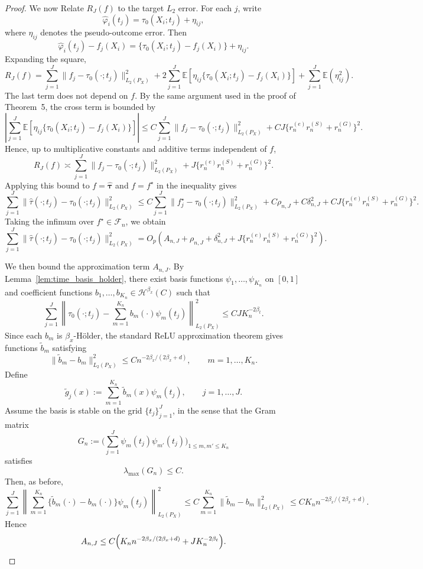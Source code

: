 \documentclass{article}
\newenvironment{proofof}[1]
{\renewcommand{\proofname}{Proof of #1}\begin{proof}}
{\end{proof}}
\begin{document}
\begin{proofof}{Theorem \ref{thm:joint_pseudo}:}
We now Relate \(R_J(f)\) to the target \(L_2\) error.
For each \(j\), write
\[
\hat\varphi_i(t_j)=\tau_0(X_i;t_j)+\eta_{ij},
\]
where \(\eta_{ij}\) denotes the pseudo-outcome error. Then
\[
\hat\varphi_i(t_j)-f_j(X_i)
=
\{\tau_0(X_i;t_j)-f_j(X_i)\}+\eta_{ij}.
\]
Expanding the square,
\[
R_J(f)
=
\sum_{j=1}^J \|f_j-\tau_0(\cdot;t_j)\|_{L_2(P_X)}^2
+
2\sum_{j=1}^J
\mathbb E\!\left[\eta_{ij}\{\tau_0(X_i;t_j)-f_j(X_i)\}\right]
+
\sum_{j=1}^J \mathbb E(\eta_{ij}^2).
\]
The last term does not depend on \(f\). By the same argument used in the proof of Theorem~5, the cross term is bounded by
\[
\left|
\sum_{j=1}^J
\mathbb E\!\left[\eta_{ij}\{\tau_0(X_i;t_j)-f_j(X_i)\}\right]
\right|
\le
C\sum_{j=1}^J \|f_j-\tau_0(\cdot;t_j)\|_{L_2(P_X)}^2
+
C J\{r_n^{(e)}r_n^{(S)}+r_n^{(G)}\}^2.
\]
Hence, up to multiplicative constants and additive terms independent of \(f\),
\[
R_J(f)
\asymp
\sum_{j=1}^J \|f_j-\tau_0(\cdot;t_j)\|_{L_2(P_X)}^2
+
J\{r_n^{(e)}r_n^{(S)}+r_n^{(G)}\}^2.
\]
Applying this bound to \(f=\hat{\boldsymbol\tau}\) and \(f=f^\star\) in the inequality  gives
\[
\sum_{j=1}^J
\|\hat\tau(\cdot;t_j)-\tau_0(\cdot;t_j)\|_{L_2(P_X)}^2
\le
C\sum_{j=1}^J
\|f^\star_j-\tau_0(\cdot;t_j)\|_{L_2(P_X)}^2
+
C\rho_{n,J}
+
C\delta_{n,J}^2
+
C J\{r_n^{(e)}r_n^{(S)}+r_n^{(G)}\}^2.
\]
Taking the infimum over \(f^\star\in\mathcal F_n\), we obtain
\[
\sum_{j=1}^J
\|\hat\tau(\cdot;t_j)-\tau_0(\cdot;t_j)\|_{L_2(P_X)}^2
=
O_p\!\left(
A_{n,J}
+
\rho_{n,J}
+
\delta_{n,J}^2
+
J\{r_n^{(e)}r_n^{(S)}+r_n^{(G)}\}^2
\right).
\]

We then bound the approximation term \(A_{n,J}\). By Lemma~\ref{lem:time_basis_holder}, there exist basis functions
\(\psi_1,\ldots,\psi_{K_n}\) on \([0,1]\) and coefficient functions
\(b_1,\ldots,b_{K_n}\in\mathcal H^{\beta_x}(C)\) such that
\[
\sum_{j=1}^J
\left\|
\tau_0(\cdot;t_j)-\sum_{m=1}^{K_n} b_m(\cdot)\psi_m(t_j)
\right\|_{L_2(P_X)}^2
\le
C J K_n^{-2\beta_t}.
\]
Since each \(b_m\) is \(\beta_x\)-H\"older, the standard ReLU approximation theorem gives functions \(\tilde b_m\) satisfying
\[
\|\tilde b_m-b_m\|_{L_2(P_X)}^2
\le
C n^{-2\beta_x/(2\beta_x+d)},
\qquad m=1,\ldots,K_n.
\]
Define
\[
\tilde g_j(x):=\sum_{m=1}^{K_n}\tilde b_m(x)\psi_m(t_j),
\qquad j=1,\ldots,J.
\]
Assume the basis is stable on the grid \(\{t_j\}_{j=1}^J\), in the sense that the Gram matrix
\[
G_n:=\Big(\sum_{j=1}^J \psi_m(t_j)\psi_{m'}(t_j)\Big)_{1\le m,m'\le K_n}
\]
satisfies
\[
\lambda_{\max}(G_n)\le C.
\]
Then, as before,
\[
\sum_{j=1}^J
\left\|
\sum_{m=1}^{K_n}\{\tilde b_m(\cdot)-b_m(\cdot)\}\psi_m(t_j)
\right\|_{L_2(P_X)}^2
\le
C \sum_{m=1}^{K_n}\|\tilde b_m-b_m\|_{L_2(P_X)}^2
\le
C K_n n^{-2\beta_x/(2\beta_x+d)}.
\]
Hence
\[
A_{n,J}
\le
C\Bigl(
K_n n^{-2\beta_x/(2\beta_x+d)}
+
J K_n^{-2\beta_t}
\Bigr).
\]


\end{proofof}
\end{document}
